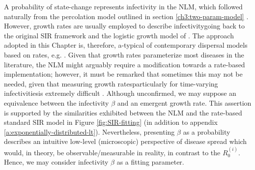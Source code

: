 A probability of state-change represents infectivity in the NLM, which followed naturally from the percolation model outlined in section \ref{ch3:two-param-model} \cite{OROZCOFUENTES201912}.
However, growth rates are usually employed to describe infectivity\textemdash going back to the original SIR framework \cite{kermack-model} and the logistic growth model of \cite{van2013plant}.
The approach adopted in this Chapter is, therefore, a-typical of contemporary dispersal models based on rates, e.g. \cite{fabre2021optimising, control-theory, white2017modelling, large-scale-control}.
Given that growth rates parameterize most diseases in the literature, the NLM might arguably require a modification towards a rate-based implementation;
however, it must be remarked that sometimes this may not be needed, given that measuring growth rates\textemdash particularly for time-varying infectivities\textemdash is extremely difficult \cite{13-challenges}.
Although unconfirmed, we may suppose an equivalence between the infectivity $\beta$ and an emergent growth rate. This assertion is supported by the similarities exhibited between the NLM and the rate-based standard SIR model in Figure \ref{fig:SIR-fitting} (in addition to appendix \ref{a:exponentially-distributed-lt}).
Nevertheless, presenting $\beta$ as a probability describes an intuitive low-level (microscopic) perspective of disease spread which would, 
in theory, be observable/measurable in reality, in contrast to the $R_0^{(i)}$.
Hence, we may consider infectivity $\beta$ as a fitting parameter.


\newpage
